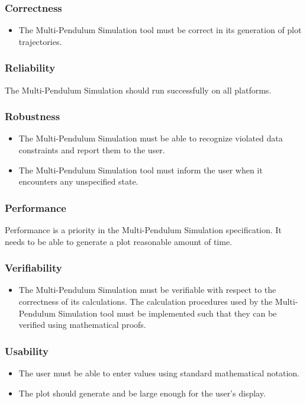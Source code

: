 \documentclass[12pt]{article}
\newcommand{\progname}{Multi-Pendulum Simulation }
\begin{document}
\subsubsection*{Correctness}
\begin{itemize}
	\item The \progname tool must be correct in its generation of plot trajectories.
\end{itemize}

\subsubsection*{Reliability}

The \progname should run successfully on all platforms.

\subsubsection*{Robustness}
\begin{itemize}
	\item The \progname must be able to recognize violated data 
	constraints and report them to the user.
	\item The \progname tool must inform the user when it encounters any 
	unspecified state.
\end{itemize}

\subsubsection*{Performance}
Performance is a priority in the \progname
specification. It needs to be able to generate a plot reasonable amount of time.

\subsubsection*{Verifiability}
\begin{itemize}
	\item The \progname must be verifiable with respect to the 
	correctness of its calculations. The calculation 
	procedures used by the \progname tool must be implemented such that 
	they can be verified using mathematical proofs.
\end{itemize}

\subsubsection*{Usability}
\begin{itemize}
	\item The user must be able to enter values using standard mathematical 
	notation.

	\item The plot should generate and be large enough for the user's display.
\end{itemize}
\end{document}
